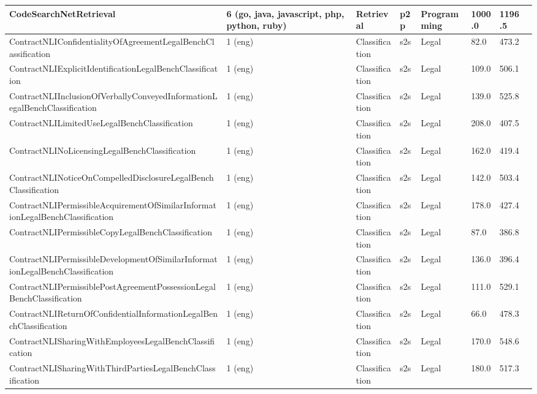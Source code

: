 \begin{longtable}{L{5.0cm}|L{1.5cm}L{1.4cm}L{1.4cm}L{1.4cm}L{1.4cm}L{1.0cm}L{1.0cm}}
 \hline 
CodeSearchNetRetrieval \cite{husain2019codesearchnet} & 6 (go, java, javascript, php, python, ruby) & Retrieval & p2p & Programming & 1000.0 & 1196.5 \\
 \hline 
ContractNLIConfidentialityOfAgreementLegalBenchClassification \cite{guha2023legalbench} & 1 (eng) & Classification & s2s & Legal & 82.0 & 473.2 \\
 \hline 
ContractNLIExplicitIdentificationLegalBenchClassification \cite{guha2023legalbench} & 1 (eng) & Classification & s2s & Legal & 109.0 & 506.1 \\
 \hline 
ContractNLIInclusionOfVerballyConveyedInformationLegalBenchClassification \cite{guha2023legalbench} & 1 (eng) & Classification & s2s & Legal & 139.0 & 525.8 \\
 \hline 
ContractNLILimitedUseLegalBenchClassification \cite{guha2023legalbench} & 1 (eng) & Classification & s2s & Legal & 208.0 & 407.5 \\
 \hline 
ContractNLINoLicensingLegalBenchClassification \cite{guha2023legalbench} & 1 (eng) & Classification & s2s & Legal & 162.0 & 419.4 \\
 \hline 
ContractNLINoticeOnCompelledDisclosureLegalBenchClassification \cite{guha2023legalbench} & 1 (eng) & Classification & s2s & Legal & 142.0 & 503.4 \\
 \hline 
ContractNLIPermissibleAcquirementOfSimilarInformationLegalBenchClassification \cite{guha2023legalbench} & 1 (eng) & Classification & s2s & Legal & 178.0 & 427.4 \\
 \hline 
ContractNLIPermissibleCopyLegalBenchClassification \cite{guha2023legalbench} & 1 (eng) & Classification & s2s & Legal & 87.0 & 386.8 \\
 \hline 
ContractNLIPermissibleDevelopmentOfSimilarInformationLegalBenchClassification \cite{guha2023legalbench} & 1 (eng) & Classification & s2s & Legal & 136.0 & 396.4 \\
 \hline 
ContractNLIPermissiblePostAgreementPossessionLegalBenchClassification \cite{guha2023legalbench} & 1 (eng) & Classification & s2s & Legal & 111.0 & 529.1 \\
 \hline 
ContractNLIReturnOfConfidentialInformationLegalBenchClassification \cite{guha2023legalbench} & 1 (eng) & Classification & s2s & Legal & 66.0 & 478.3 \\
 \hline 
ContractNLISharingWithEmployeesLegalBenchClassification \cite{guha2023legalbench} & 1 (eng) & Classification & s2s & Legal & 170.0 & 548.6 \\
 \hline 
ContractNLISharingWithThirdPartiesLegalBenchClassification \cite{guha2023legalbench} & 1 (eng) & Classification & s2s & Legal & 180.0 & 517.3 \\

\end{longtable}
